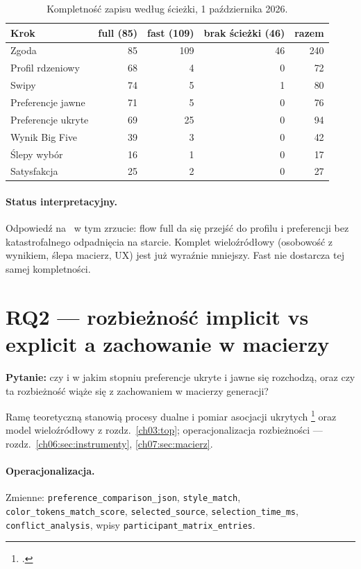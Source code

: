 \begin{table}[htbp]
  \centering
  \small
  \caption{Kompletność zapisu według ścieżki, 1 października 2026.}
  \label{tab:ch08:completeness}
  \begin{tabular}{lrrrr}
    \toprule
    Krok & full (85) & fast (109) & brak ścieżki (46) & razem \\
    \midrule
    Zgoda & 85 & 109 & 46 & 240 \\
    Profil rdzeniowy & 68 & 4 & 0 & 72 \\
    Swipy & 74 & 5 & 1 & 80 \\
    Preferencje jawne & 71 & 5 & 0 & 76 \\
    Preferencje ukryte & 69 & 25 & 0 & 94 \\
    Wynik Big Five & 39 & 3 & 0 & 42 \\
    Ślepy wybór & 16 & 1 & 0 & 17 \\
    Satysfakcja & 25 & 2 & 0 & 27 \\
    \bottomrule
  \end{tabular}
\end{table}

\paragraph{Status interpretacyjny.}
Odpowiedź na~ w tym zrzucie: flow full da się przejść do profilu i preferencji bez katastrofalnego odpadnięcia na starcie. Komplet wieloźródłowy (osobowość z wynikiem, ślepa macierz, UX) jest już wyraźnie mniejszy. Fast nie dostarcza tej samej kompletności.

\section{RQ2 --- rozbieżność implicit vs explicit a zachowanie w macierzy}
\label{ch08:sec:rq2}

\textbf{Pytanie:} czy i w jakim stopniu preferencje ukryte i jawne się rozchodzą, oraz czy ta rozbieżność wiąże się z zachowaniem w macierzy generacji?

Ramę teoretyczną stanowią procesy dualne i pomiar asocjacji ukrytych \footcite{kahneman2011thinking,greenwald1998iat} oraz model wieloźródłowy z rozdz.~\ref{ch03:top}; operacjonalizacja rozbieżności --- rozdz.~\ref{ch06:sec:instrumenty}, \ref{ch07:sec:macierz}.

\paragraph{Operacjonalizacja.}
Zmienne: \texttt{preference\_comparison\_json}, \texttt{style\_match}, \texttt{color\_tokens\_match\_score}, \texttt{selected\_source}, \texttt{selection\_time\_ms}, \texttt{conflict\_analysis}, wpisy \texttt{participant\_matrix\_entries}.

